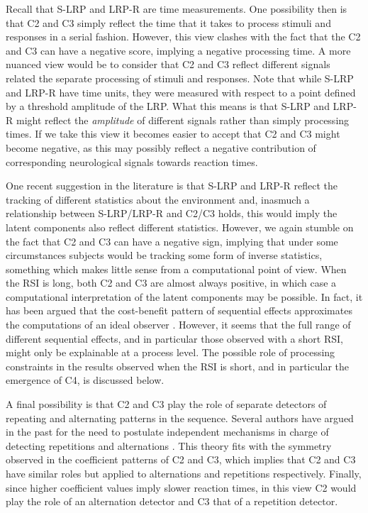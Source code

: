 \documentclass{apa}[12pt]
\begin{document}
Recall that S-LRP and LRP-R are time measurements. One possibility then is that C2 and C3 simply reflect the time that it takes to process stimuli and responses in a serial fashion. However, this view clashes with the fact that the C2 and C3 can have a negative score, implying a negative processing time. A more nuanced view would be to consider that C2 and C3 reflect different signals related the separate processing of stimuli and responses. Note that while S-LRP and LRP-R have time units, they were measured with respect to a point defined by a threshold amplitude of the LRP. What this means is that S-LRP and LRP-R might reflect the \textit{amplitude} of different signals rather than simply processing times. If we take this view it becomes easier to accept that C2 and C3 might become negative, as this may possibly reflect a negative contribution of corresponding neurological signals towards reaction times.

One recent suggestion in the literature is that S-LRP and LRP-R reflect the tracking of different statistics about the environment \cite{Jones13} and, inasmuch a relationship between S-LRP/LRP-R and C2/C3  holds, this would imply the latent components also reflect different statistics. However, we again stumble on the fact that C2 and C3 can have a negative sign, implying that under some circumstances subjects would be tracking some form of inverse statistics, something which makes little sense from a computational point of view. When the RSI is long, both C2 and C3 are almost always positive, in which case a computational interpretation of the latent components may be possible. In fact, it has been argued that the cost-benefit pattern of sequential effects approximates the computations of an ideal observer \cite{Yu08}. However, it seems that the full range of different sequential effects, and in particular those observed with a short RSI, might only be explainable at a process level. The possible role of processing constraints in the results observed when the RSI is short, and in particular the emergence of C4, is discussed below.

A final possibility is that C2 and C3 play the role of separate detectors of repeating and alternating patterns in the sequence. Several authors have argued in the past for the need to postulate independent mechanisms in charge of detecting repetitions and alternations \cite{Hale69,Maloney05}. This theory fits with the symmetry observed in the coefficient patterns of C2 and C3, which implies that C2 and C3 have similar roles but applied to alternations and repetitions respectively. Finally, since higher coefficient values imply slower reaction times, in this view C2 would play the role of an alternation detector and C3 that of a repetition detector.
\end{document}
